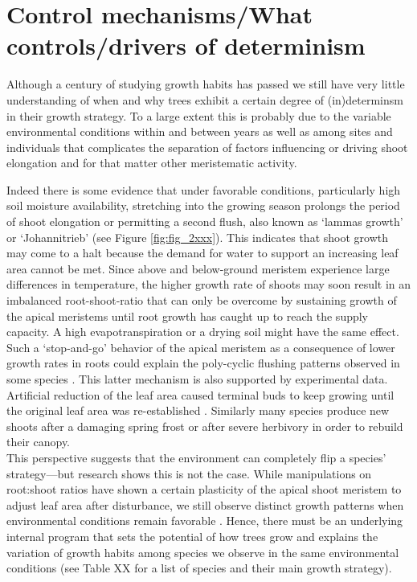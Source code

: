 \documentclass{article}
\begin{document}
\section*{Control mechanisms/What controls/drivers of determinism}
Although a century of studying growth habits has passed we still have very little understanding of when and why trees exhibit a certain degree of (in)determinsm in their growth strategy. To a large extent this is probably due to the variable environmental conditions within and between years as well as among sites and individuals that complicates the separation of factors influencing or driving shoot elongation and for that matter other meristematic activity.

Indeed there is some evidence that under favorable conditions, particularly high soil moisture availability, stretching into the growing season prolongs the period of shoot elongation or permitting a second flush, also known as `lammas growth' or `Johannitrieb' (see Figure \ref{fig:fig_2xxx}). This indicates that shoot growth may come to a halt because the demand for water to support an increasing leaf area cannot be met. Since above and below-ground meristem experience large differences in temperature, the higher growth rate of shoots may soon result in an imbalanced root-shoot-ratio that can only be overcome by sustaining growth of the apical meristems until root growth has caught up to reach the supply capacity. A high evapotranspiration or a drying soil might have the same effect. Such a `stop-and-go' behavior of the apical meristem as a  consequence of lower growth rates in roots could explain the poly-cyclic flushing patterns observed in some species \cite{girardPolycyclismFundamentalTree2011}. This latter mechanism is also supported by experimental data. Artificial reduction of the leaf area caused terminal buds to keep growing until the original leaf area was re-established \citep{borchertSimulationRhythmicTree1973}. Similarly many species produce new shoots after a damaging spring frost or after severe herbivory in order to rebuild their canopy. \\

This perspective suggests that the environment can completely flip a species' strategy---but research shows this is not the case. While manipulations on root:shoot ratios have shown a certain plasticity of the apical shoot meristem to adjust leaf area after disturbance, we still observe distinct growth patterns when environmental conditions remain favorable . Hence, there must be an underlying internal program that sets the potential of how trees grow and explains the variation of growth habits among species we observe in the same environmental conditions (see Table XX for a list of species and their main growth strategy). 
\end{document}
